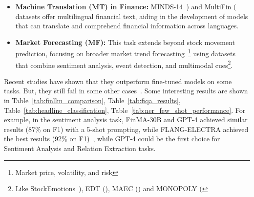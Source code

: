 \begin{itemize}
	\item \textbf{Machine Translation (MT) in Finance:} MINDS-14~\cite{gerz2021multilingual}) and MultiFin (\textcite{jorgensen2023multifin} datasets offer multilingual financial text, aiding in the development of models that can translate and comprehend financial information across languages.
	\item \textbf{Market Forecasting (MF):} This task extends beyond stock movement prediction, focusing on broader market trend forecasting~\footnote{Market price, volatility, and risk} using datasets that combine sentiment analysis, event detection, and multimodal cues\footnote{Like StockEmotions~\cite{lee2023stockemotions}), EDT (\textcite{zhou2021trade}), MAEC (\textcite{li2020maec}) and MONOPOLY (\textcite{mathur2022monopoly}}.
\end{itemize}

Recent studies have shown that they outperform fine-tuned models on some tasks.
But, they still fail in some other cases~\cite{li2023chatgpt}.
Some interesting results are shown in Table~\ref{tab:finllm_comparison}, Table~\ref{tab:fiqa_results}, Table~\ref{tab:headline_classification}, Table~\ref{tab:ner_few_shot_performance}.
For example, in the sentiment analysis task, FinMA-30B and GPT-4 achieved similar results (87\% on F1) with a 5-shot prompting, while FLANG-ELECTRA achieved the best results (92\% on F1)~\textcite{lee2024survey}, while GPT-4 could be the first choice for Sentiment Analysis and Relation Extraction tasks.

